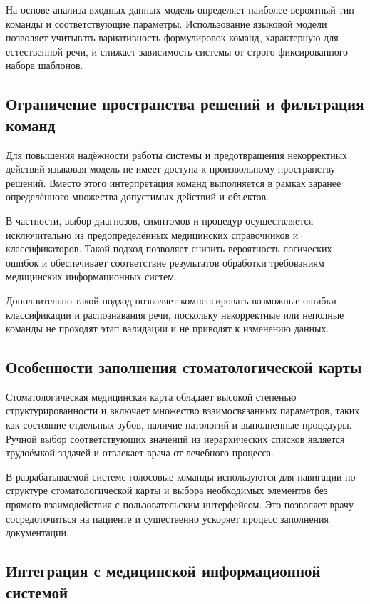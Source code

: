 На основе анализа входных данных модель определяет наиболее вероятный тип команды и соответствующие параметры. Использование языковой модели позволяет учитывать вариативность формулировок команд, характерную для естественной речи, и снижает зависимость системы от строго фиксированного набора шаблонов.

\subsection{Ограничение пространства решений и фильтрация команд}

Для повышения надёжности работы системы и предотвращения некорректных действий языковая модель не имеет доступа к произвольному пространству решений. Вместо этого интерпретация команд выполняется в рамках заранее определённого множества допустимых действий и объектов.

В частности, выбор диагнозов, симптомов и процедур осуществляется исключительно из предопределённых медицинских справочников и классификаторов. Такой подход позволяет снизить вероятность логических ошибок и обеспечивает соответствие результатов обработки требованиям медицинских информационных систем.

Дополнительно такой подход позволяет компенсировать возможные ошибки классификации и распознавания речи, поскольку некорректные или неполные команды не проходят этап валидации и не приводят к изменению данных.

\subsection{Особенности заполнения стоматологической карты}

Стоматологическая медицинская карта обладает высокой степенью структурированности и включает множество взаимосвязанных параметров, таких как состояние отдельных зубов, наличие патологий и выполненные процедуры. Ручной выбор соответствующих значений из иерархических списков является трудоёмкой задачей и отвлекает врача от лечебного процесса.

В разрабатываемой системе голосовые команды используются для навигации по структуре стоматологической карты и выбора необходимых элементов без прямого взаимодействия с пользовательским интерфейсом. Это позволяет врачу сосредоточиться на пациенте и существенно ускоряет процесс заполнения документации.

\subsection{Интеграция с медицинской информационной системой}

